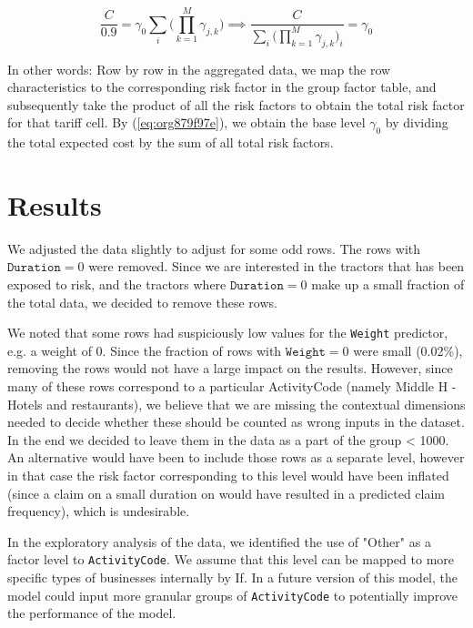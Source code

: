 \documentclass[11pt]{article}
\begin{document}
\begin{enumerate}
\begin{equation}
\label{eq:org879f97e}
\frac{C}{0.9} = \gamma_0 \sum_i \bigg ( \prod_{k = 1}^M \gamma_{j,k} \bigg) \implies \frac{C}{\sum_i \bigg ( \prod_{k = 1}^M \gamma_{j,k} \bigg)_i} = \gamma_0
\end{equation}

In other words: Row by row in the aggregated data, we map the row characteristics to the
corresponding risk factor  in the group factor table, and subsequently take the product of all 
the risk factors to obtain the total risk factor for that tariff cell. By (\ref{eq:org879f97e}), we obtain the 
base level \(\gamma_0\) by dividing the total expected cost by the sum of all total risk factors.
\end{enumerate}

\section{Results}
\label{sec:orgc277d6e}

We adjusted the data slightly to adjust for some odd rows. The rows with \(\texttt{Duration} = 0\) were removed. 
Since we are interested in the tractors that has been exposed to risk, and the tractors where 
\(\texttt{Duration} = 0\) make up a small fraction of the total data, we decided to remove these rows. 

We noted that some rows had suspiciously low values for the \texttt{Weight} predictor, e.g. a weight of 0. 
Since the fraction of rows with \(\texttt{Weight} = 0\) were small (0.02\%), removing the rows would not have
a large impact on the results. However, since many 
of these rows correspond to a particular ActivityCode (namely Middle H - Hotels and restaurants), 
we believe that we are missing the contextual dimensions needed to decide whether these should be counted 
as wrong inputs in the dataset. In the end we decided to leave them in the data as a part of the
group < 1000. An alternative would have been to include those rows as a separate level, however in that case the risk factor
corresponding to this level would have been inflated (since a claim on a small duration on would have resulted
in a predicted claim frequency), which is undesirable.

In the exploratory analysis of the data, we identified the use of "Other" as a factor level to \texttt{ActivityCode}. 
We assume that this level can be mapped to more specific types of businesses internally by If. In a future version
of this model, the model could input more granular groups of \texttt{ActivityCode} to potentially improve 
the performance of the model.
\end{document}
